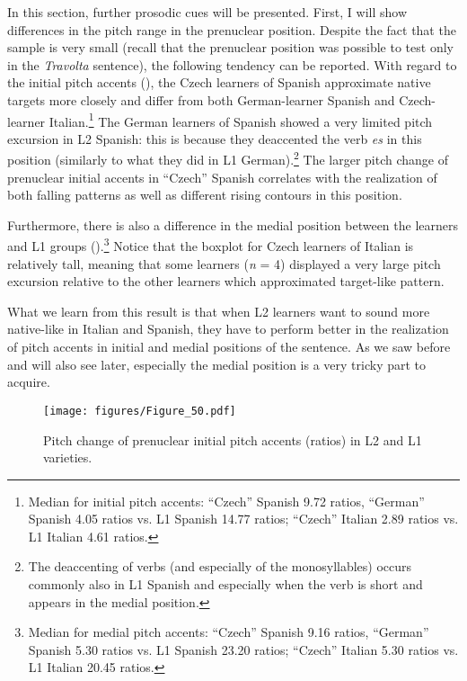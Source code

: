 In this section, further prosodic cues will be presented. First, I will show differences in the pitch range in the prenuclear position. Despite the fact that the sample is very small (recall that the prenuclear position was possible to test only in the \textit{Travolta}{} sentence), the following tendency can be reported. With regard to the initial pitch accents (), the Czech learners of Spanish approximate native targets more closely and differ from both German-learner Spanish and Czech-learner Italian.\footnote{Median for initial pitch accents: “Czech” Spanish 9.72 ratios, “German” Spanish 4.05 ratios vs. L1 Spanish 14.77 ratios; “Czech” Italian 2.89 ratios vs. L1 Italian 4.61 ratios.} The German learners of Spanish showed a very limited pitch excursion in L2 Spanish: this is because they deaccented the verb \textit{es} in this position (similarly to what they did in L1 German).\footnote{The deaccenting of verbs (and especially of the monosyllables) occurs commonly also in L1 Spanish and especially when the verb is short and appears in the medial position.} The larger pitch change of prenuclear initial accents in “Czech” Spanish correlates with the realization of both falling patterns as well as different rising contours in this position.

Furthermore, there is also a difference in the medial position between the learners and L1 groups ().{\footnote{Median for medial pitch accents: “Czech” Spanish 9.16 ratios, “German” Spanish 5.30 ratios vs. L1 Spanish 23.20 ratios; “Czech” Italian 5.30 ratios vs. L1 Italian 20.45 ratios.}} Notice that the boxplot for Czech learners of Italian is relatively tall, meaning that some learners (\textit{n} = 4) displayed a very large pitch excursion relative to the other learners which approximated target-like pattern.\largerpage[2.25]

What we learn from this result is that when L2 learners want to sound more native-like in Italian and Spanish, they have to perform better in the realization of pitch accents in initial and medial positions of the sentence. As we saw before and will also see later, especially the medial position is a very tricky part to acquire.\pagebreak


\begin{figure}
\texttt{[image: figures/Figure\_50.pdf]}
\caption{Pitch change of prenuclear initial pitch accents (ratios) in L2 and L1 varieties.}
\label{fig:4.50}
\end{figure}


